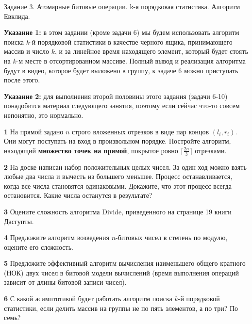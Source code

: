\documentclass{article}
\begin{document}
\begin{center}
\Large {Задание 3. Атомарные битовые операции. k-я порядковая статистика. Алгоритм Евклида.}
\end{center}

\bigskip

\textbf{Указание 1:} в этом задании (кроме задачи 6) мы будем использовать алгоритм поиска $k$-й порядковой статистики в качестве черного ящика, принимающего массив и число $k$, и за линейное время находящего элемент, который будет стоять на $k$-м месте в отсортированном массиве. Полный вывод и реализация алгоритма будут в видео, которое будет выложено в группу, к задаче 6 можно приступать после этого.

\medskip

\textbf{Указание 2:} для выполнения второй половины этого задания (задачи 6-10) понадобится материал следующего занятия, поэтому если сейчас что-то совсем непонятно, это нормально.

\medskip

\textbf{1} На прямой задано $n$ строго вложенных отрезков в виде пар концов $(l_i, r_i)$. Они могут поступать на вход в произвольном порядке. Постройте алгоритм, находящий \textbf{множество точек на прямой}, покрытое ровно $\lceil \frac{2n}{3} \rceil$ отрезками.

\medskip

\textbf{2} На доске написан набор положительных целых чисел. За один ход можно взять любые два числа и вычесть из большего меньшее. Процесс останавливается, когда все числа становятся одинаковыми. Докажите, что этот процесс всегда остановится. Какие числа останутся в результате?

\medskip

\textbf{3} Оцените сложность алгоритма Divide, приведенного на странице 19 книги Дасгупты.

\medskip

\textbf{4} Предложите алгоритм возведения $n$-битовых чисел в степень по модулю, оцените его сложность.

\medskip

\textbf{5} Предложите эффективный алгоритм вычисления наименьшего общего кратного (НОК) двух чисел в битовой модели вычислений (время выполнения операций зависит от длины битовой записи чисел).

\medskip

\textbf{6} С какой асимптотикой будет работать алгоритм поиска $k$-й порядковой статистики, если делить массив на группы не по пять элементов, а по три? По семь?
\end{document}
